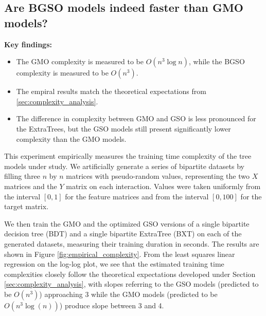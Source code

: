 \subsection{Are BGSO models indeed faster than GMO models?}
\label{sec:empirical_complexity}

\begin{mdframed}
    \textbf{Key findings:}
    \begin{itemize}
        \item The GMO complexity is measured to be $O(n^3\log n)$, while the BGSO complexity is measured to be $O(n^3)$.

        \item The empiral results match the theoretical expectations from \autoref{sec:complexity_analysis}.
        
        \item The difference in complexity between GMO and GSO is less pronounced for the ExtraTrees, but the GSO models still present significantly lower complexity than the GMO models.
    \end{itemize}
\end{mdframed}

This experiment empirically measures the training time complexity of the tree models under study. We artificially generate a series of bipartite datasets by filling three $n$ by $n$ matrices with pseudo-random values, representing the two $X$ matrices and the $Y$ matrix on each interaction. Values were taken uniformly from the interval $[0, 1]$ for the feature matrices and from the interval $[0, 100]$ for the target matrix.

We then train the GMO and the optimized GSO versions of a single bipartite decision tree (BDT) and a single bipartite ExtraTree (BXT) on each of the generated datasets, measuring their training duration in seconds. The results are shown in Figure \ref{fig:empirical_complexity}. From the least squares linear regression on the log-log plot, we see that the estimated training time complexities closely follow the theoretical expectations developed under Section \ref{sec:complexity_analysis}, with slopes referring to the GSO models (predicted to be $O(n^3)$) approaching 3 while the GMO models (predicted to be $O(n^3\log(n))$) produce slope between 3 and 4.

